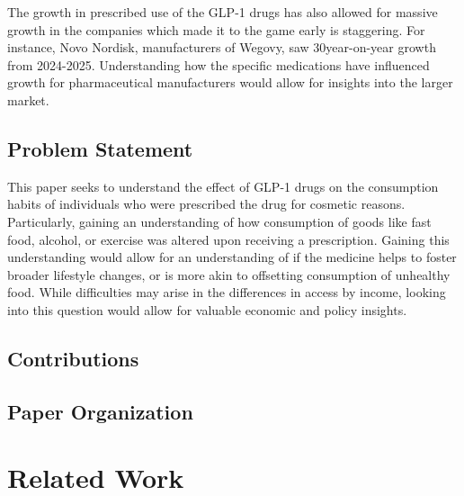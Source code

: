 \documentclass[11pt,a4paper]{article}
\begin{document}
The growth in prescribed use of the GLP-1 drugs has also allowed for massive growth in the companies which made it to the game early is staggering.
For instance, Novo Nordisk, manufacturers of Wegovy, saw 30\percent year-on-year growth from 2024-2025. Understanding how the specific medications
have influenced growth for pharmaceutical manufacturers would allow for insights into the larger market.

\subsection{Problem Statement}
\label{subsec:problem}
This paper seeks to understand the effect of GLP-1 drugs on the consumption habits of individuals who were prescribed the drug
for cosmetic reasons. Particularly, gaining an understanding of how consumption of goods like fast food, alcohol, or exercise 
was altered upon receiving a prescription. Gaining this understanding would allow for an understanding of if the medicine helps
to foster broader lifestyle changes, or is more akin to offsetting consumption of unhealthy food. While difficulties may arise in
the differences in access by income, looking into this question would allow for valuable economic and policy insights.

\subsection{Contributions}
\label{subsec:contributions}


\subsection{Paper Organization}
\label{subsec:organization}


\section{Related Work}
\label{sec:related_work}
\end{document}
